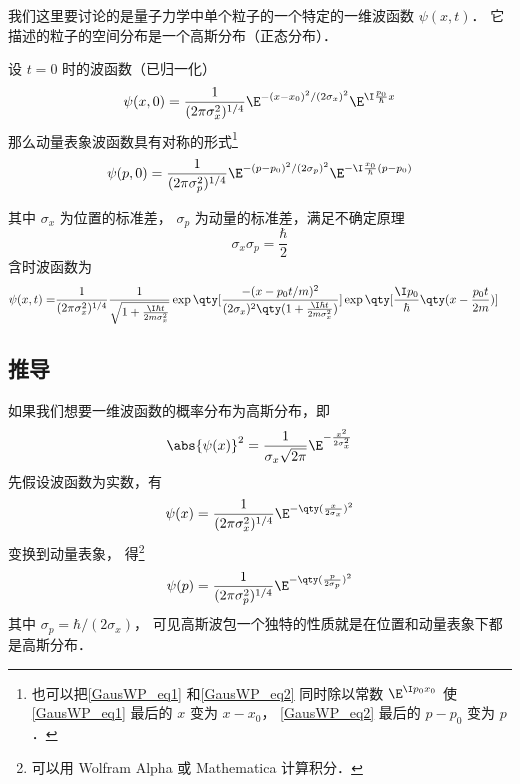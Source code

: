 
\begin{issues}
\issueAbstract
\issueTODO
\end{issues}



我们这里要讨论的是量子力学中单个粒子的一个特定的一维波函数 $\psi(x,t)$． 它描述的粒子的空间分布是一个高斯分布（正态分布）．

设 $t = 0$ 时的波函数（已归一化）
\begin{equation}\label{GausWP_eq1}
\psi (x,0) = \frac{1}{(2\pi\sigma_x ^2)^{1/4}} \E^{-(x - x_0)^2/(2\sigma_x)^2} \E^{\I \frac{p_0}{\hbar}x}
\end{equation}
那么动量表象波函数具有对称的形式\footnote{也可以把\autoref{GausWP_eq1} 和\autoref{GausWP_eq2} 同时除以常数 $\E^{\I p_0 x_0}$ 使\autoref{GausWP_eq1} 最后的 $x$ 变为 $x-x_0$， \autoref{GausWP_eq2} 最后的 $p-p_0$ 变为 $p$． }%
\begin{equation}\label{GausWP_eq2}
\psi (p,0) = \frac{1}{(2\pi\sigma_p^2)^{1/4}} \E^{-(p - p_0)^2/(2\sigma_p)^2} \E^{-\I\frac{x_0}{\hbar }(p - p_0)}
\end{equation}

其中 $\sigma_x$ 为位置的标准差， $\sigma_p$ 为动量的标准差，满足不确定原理
\begin{equation}
\sigma_x\sigma_p = \frac{\hbar}{2}
\end{equation}
含时波函数为
\begin{equation}\begin{aligned}
\psi (x,t) = &\frac{1}{(2\pi\sigma_x^2)^{1/4}} \frac{1}{\sqrt{1 + \frac{\I\hbar t}{2m \sigma_x^2}}}
\exp\qty[\frac{-(x - p_0 t/m)^2}{(2\sigma_x )^2 \qty(1 + \frac{\I\hbar t}{2m \sigma_x^2})}] \exp\qty[\frac{\I p_0}{\hbar } \qty(x - \frac{p_0 t}{2m})]
\end{aligned}\end{equation}

\subsection{推导}

如果我们想要一维波函数的概率分布为高斯分布，即
\begin{equation}
\abs{\psi (x)}^2 = \frac{1}{\sigma_x \sqrt{2\pi}} \E^{-\frac{x^2}{2\sigma_x^2}}
\end{equation}
先假设波函数为实数，有
\begin{equation}
\psi (x) = \frac{1}{(2\pi\sigma_x^2)^{1/4}} \E^{-\qty(\frac{x}{2\sigma_x})^2}
\end{equation}
变换到动量表象，%
得\footnote{可以用 Wolfram Alpha 或 Mathematica 计算积分．}
\begin{equation}
\psi(p) = \frac{1}{(2\pi\sigma_p^2)^{1/4}} \E^{-\qty(\frac{p}{2\sigma_p})^2}
\end{equation}
其中 $\sigma_p = \hbar/(2\sigma_x)$， 可见高斯波包一个独特的性质就是在位置和动量表象下都是高斯分布．


